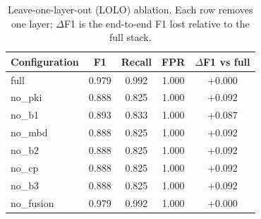 \begin{table}[t]
\centering
\caption{Leave-one-layer-out (LOLO) ablation. Each row removes one layer; $\Delta$F1 is the end-to-end F1 lost relative to the full stack.}
\label{tab:lolo}
\begin{tabular}{lcccc}
\toprule
Configuration & F1 & Recall & FPR & $\Delta$F1 vs full \\
\midrule
full & 0.979 & 0.992 & 1.000 & +0.000 \\
no\_pki & 0.888 & 0.825 & 1.000 & +0.092 \\
no\_b1 & 0.893 & 0.833 & 1.000 & +0.087 \\
no\_mbd & 0.888 & 0.825 & 1.000 & +0.092 \\
no\_b2 & 0.888 & 0.825 & 1.000 & +0.092 \\
no\_cp & 0.888 & 0.825 & 1.000 & +0.092 \\
no\_b3 & 0.888 & 0.825 & 1.000 & +0.092 \\
no\_fusion & 0.979 & 0.992 & 1.000 & +0.000 \\
\bottomrule
\end{tabular}
\end{table}
